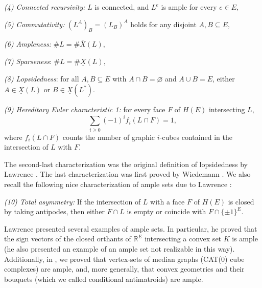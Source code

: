 \documentclass[11pt,a4paper]{amsart}
\theoremstyle{definition}
\numberwithin{equation}{section}
\newcommand{\covectors}{\ensuremath{L}}
\newcommand{\X}{\ensuremath{X}}
\newcommand{\HH}{\ensuremath{H}}
\begin{document}
\medskip\noindent
{\it {\rm(4)} Connected recursivity:} ${\covectors}$ is connected,
and ${\covectors}^e$ is ample for
every $e\in E,$

\medskip\noindent
{\it {\rm(5)} Commutativity:}   $({\covectors}^A)_B=({\covectors}_B)^A$ holds for
any disjoint  $A,B\subseteq E,$

\medskip\noindent
{\it {\rm(6)} Ampleness:}  $\#{\covectors}=\#\overline{\X}({\covectors}),$

\medskip\noindent
{\it {\rm(7)} Sparseness}: $\# {\covectors}=\# \underline{{\X}}({\covectors}),$

\medskip\noindent
{\it {\rm(8)} Lopsidedness}: for all $A,B\subseteq E$ with $A\cap B=\varnothing$ and $A\cup B=E$, either $A\in  \underline{{\X}}({\covectors})$ or $B\in  \underline{{\X}}({\covectors}^*)$.

\medskip\noindent
{\it {\rm(9)} Hereditary Euler characteristic 1:} for every face $F$ of $\HH(E)$ intersecting $\covectors$,
$$\sum_{i\ge 0} (-1)^if_i({\covectors}\cap F)=1,$$
where $f_i({\covectors}\cap F)$ counts the number of graphic $i$-cubes contained in the
intersection of $\covectors$ with $F$.


\medskip
The second-last characterization was the original definition of lopsidedness by Lawrence \cite{La}. The last characterization was first proved by Wiedemann  \cite{Wi}. We also recall the following nice characterization of ample sets due to Lawrence \cite{La}:

\medskip\noindent
{\it {\rm(10)} Total asymmetry:} If the intersection of ${\covectors}$ with a face $F$ of $\HH(E)$ is closed by taking antipodes, then either $F\cap \covectors$ is empty or coincide with $F\cap \{ \pm 1\}^E$.


\medskip
Lawrence \cite{La} presented several examples of ample sets. In particular, he proved that the sign vectors of the closed orthants of $\mathbb R^E$ intersecting a convex set $K$ is ample (he also presented an example of an ample set not realizable in this way). Additionally, in \cite{BaChDrKo}, we proved that vertex-sets of median graphs (CAT(0) cube complexes) are ample, and, more generally, that convex geometries and their bouquets  (which we called conditional antimatroids) are ample.
\end{document}
